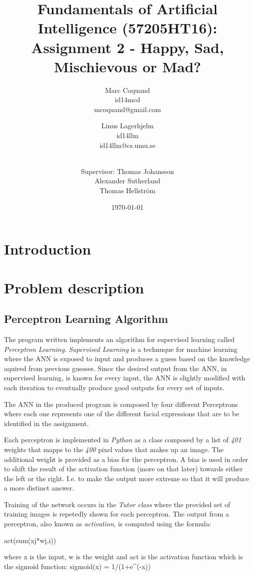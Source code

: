 \documentclass[12pt]{article}
\title{Fundamentals of Artificial Intelligence (57205HT16): Assignment 2 -
Happy, Sad, Mischievous or Mad?}
\author{
    Marc Coquand \\ 
    id14mcd \\
    mcoquand@gmail.com \and
		Linus Lagerhjelm \\
		id14llm \\
		id14llm@cs.umu.se \and \\
		Supervisor: Thomas Johansson\\
		Alexander Sutherland \\
		Thomas Hellström
}
\date{\today}
\begin{document}
\maketitle

\newpage
\tableofcontents

\newpage
\section{Introduction}



\section {Problem description}

\subsection {Perceptron Learning Algorithm}
The program written implements an algorithm for supervised learning called
\textit{Perceptron Learning}. \textit{Supervised Learning} is a technuque
for machine learning where the ANN is exposed to input and produces a guess
based on the knowledge aquired from previous guesses. Since the desired
output from the ANN, in supervised learning, is known for every input, the
ANN is slightly modified with each iteration to eventually produce good
outputs for every set of inputs.

The ANN in the produced program is composed by four different Perceptrons
where each one represents one of the different facial expressions that are
to be identified in the assignment.

Each perceptron is implemented in \textit{Python} as a class composed by a
list of \textit{401} weights that mapps to the \textit{400} pixel values
that makes up an image. The additional weight is provided as a bias for
the perceptron. A bias is used in order to shift the result of the activation
function (more on that later) towards either the left or the right. I.e.
to make the output more extreme so that it will produce a more distinct
answer.

Training of the network occurs in the \textit{Tutor class} where the provided
set of training images is repetedly shown for each perceptron. The output
from a perceptron, also known as \textit{activation}, is computed using
the formula:

act(sum(xj*wj,i))

where x is the input, w is the weight and act is the activation function
which is the sigmoid function:
sigmoid(x) = 1/(1+e^(-x))

\newpage
%
\end{document}
